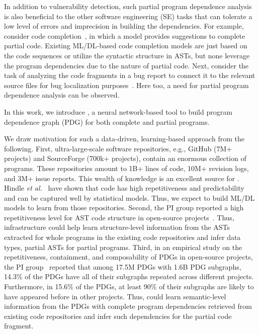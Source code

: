 In addition to vulnerability detection, such partial program dependence analysis is also beneficial to the other software engineering (SE) tasks that can tolerate a low level of errors and imprecision in building the dependencies. For example, consider code completion~\cite{codefill-icse22,facebook-icse21}, in which a model provides suggestions to complete partial code. Existing ML/DL-based code completion models are just based on the code sequences or utilize the syntactic structure in ASTs, but none leverage the program dependencies due to the nature of partial code. Next, consider the task of analyzing the code fragments in a bug report to connect it to the relevant source files for bug localization purposes~\cite{euler-fse19,icpc17}. Here too, a need for partial program dependence analysis can be observed.

In this work, we introduce \tool, a neural network-based tool to build
program dependence graph (PDG) for both complete and partial
programs. 

We draw motivation for such a data-driven, learning-based approach from the following. First, ultra-large-scale software repositories, e.g., GitHub (7M+ projects) and SourceForge (700k+ projects), contain an enormous collection of programs. These repositories amount to 1B+ lines of code, 10M+ revision logs, and 3M+ issue reports. This wealth of knowledge is an excellent source for {\tool}. Hindle {\em et al.}~\cite{naturalness-icse12} have shown that code has high repetitiveness and predictability and can be captured well by statistical models. Thus, we expect to build ML/DL models to learn from those repositories. 
Second, the PI group reported a high repetitiveness level for AST code structure in open-source projects~\cite{icse15}. Thus, {\tool} infrastructure could help learn structure-level information from the ASTs extracted for whole programs in the existing code repositories and infer data types, partial ASTs for partial programs. Third, in an empirical study on the repetitiveness, containment, and composability of PDGs in open-source projects, the PI group~\cite{msr16} reported that among 17.5M PDGs with 1.6B PDG subgraphs, 14.3\% of the PDGs have all of their subgraphs repeated across different projects. Furthermore, in 15.6\% of the PDGs, at least 90\% of their subgraphs are likely to have appeared before in other projects. 
Thus, {\tool} could learn semantic-level information from the PDGs
with complete program dependencies retrieved from existing code
repositories and infer such dependencies for the partial code
fragment.

